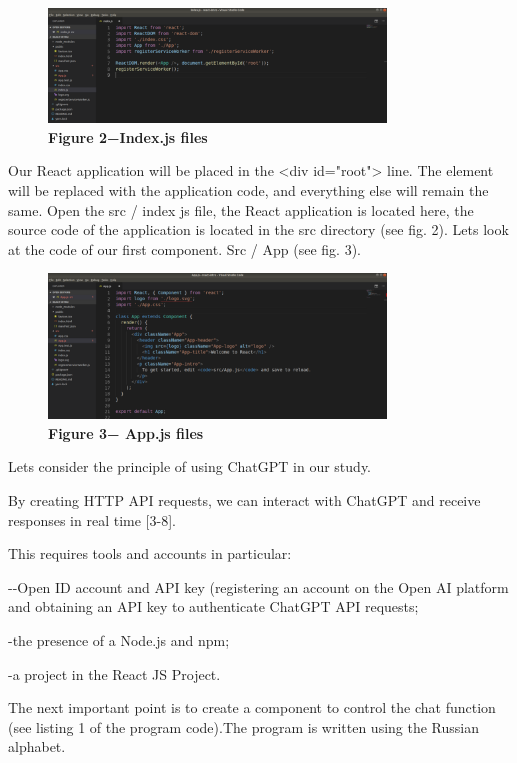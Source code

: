 \begin{figure}[H]
	\centering
	\includegraphics[width=0.8\textwidth]{assets/127}
	\caption*{\bfseries Figure 2−Index.js files}
\end{figure}
\begin{multicols}{2}

Our React application will be placed in the \textless div id="root"\textgreater{} line. 
The element will be replaced with the application code, and everything 
else will remain the same.	
Open the src / index js file, the React application is located here, the
source code of the application is located in the src directory (see fig.
2).
Let\textquotesingle s look at the code of our first component. Src / App (see fig. 3). 
	
\end{multicols}

\begin{figure}[H]
	\centering
	\includegraphics[width=0.8\textwidth]{assets/128}
	\caption*{\bfseries Figure 3− App.js files}
\end{figure}

\begin{multicols}{2}


Let\textquotesingle s consider the principle of using ChatGPT in our
study.

By creating HTTP API requests, we can interact with ChatGPT and receive
responses in real time {[}3-8{]}.

This requires tools and accounts in particular:

-\/-Open ID account and API key (registering an account on the Open AI
platform and obtaining an API key to authenticate ChatGPT API requests;

-the presence of a Node.js and npm;

-a project in the React JS Project.


The next important point is to create a component to control the chat
function (see listing 1 of the program code).The program is written
using the Russian alphabet.
	

\end{multicols}

